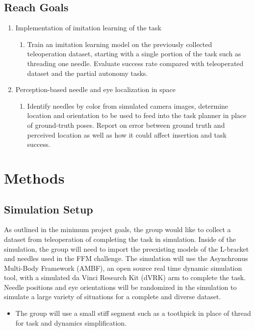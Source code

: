 \documentclass[conference]{IEEEtran}
\begin{document}
\subsection{Reach Goals}
\begin{enumerate}
    \item Implementation of imitation learning of the task
    \begin{enumerate}
        \item Train an imitation learning model on the previously collected teleoperation dataset, starting with a single portion of the task such as threading one needle. Evaluate success rate compared with teleoperated dataset and the partial autonomy tasks.
    \end{enumerate}
    
    \item Perception-based needle and eye localization in space
    \begin{enumerate}
        \item Identify needles by color from simulated camera images, determine location and orientation to be used to feed into the task planner in place of ground-truth poses. Report on error between ground truth and perceived location as well as how it could affect insertion and task success. 
    \end{enumerate}
\end{enumerate}


\section{Methods}

\subsection{Simulation Setup}
    As outlined in the minimum project goals, the group would like to collect a dataset from teleoperation of completing the task in simulation. Inside of the simulation, the group will need to import the preexisting models of the L-bracket and needles used in the FFM challenge. The simulation will use the Asynchronus Multi-Body Framework (AMBF), an open source real time dynamic simulation tool, with a simulated da Vinci Research Kit (dVRK) arm to complete the task. Needle positions and eye orientations will be randomized in the simulation to simulate a large variety of situations for a complete and diverse dataset. 
    \begin{itemize}
\item{The group will use a small stiff segment such as a toothpick in place of thread for task and dynamics simplification.}
\end{itemize}
\end{document}
